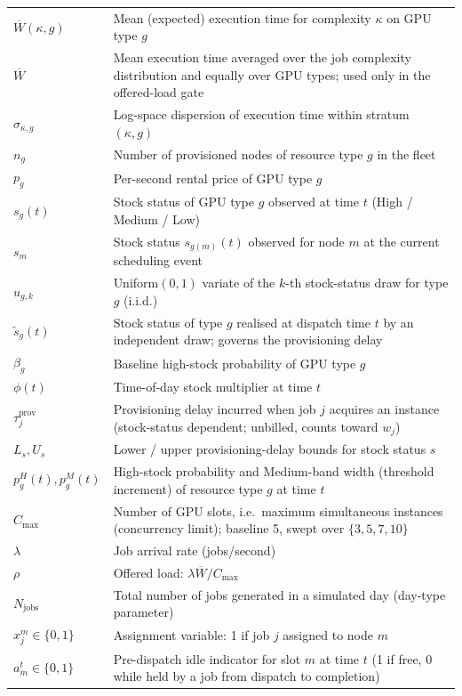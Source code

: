 \begin{longtable}{l>{\raggedright\arraybackslash}p{10cm}}
$\overline{W}(\kappa,g)$ & Mean (expected) execution time for complexity $\kappa$ on GPU type $g$ \\
$\overline{W}$ & Mean execution time averaged over the job complexity distribution and equally over GPU types; used only in the offered-load gate \\
$\sigma_{\kappa,g}$ & Log-space dispersion of execution time within stratum $(\kappa,g)$ \\
$n_g$ & Number of provisioned nodes of resource type $g$ in the fleet \\
$p_g$ & Per-second rental price of GPU type $g$ \\
$s_g(t)$ & Stock status of GPU type $g$ observed at time $t$ (High / Medium / Low) \\
$s_m$ & Stock status $s_{g(m)}(t)$ observed for node $m$ at the current scheduling event \\
$u_{g,k}$ & Uniform$(0,1)$ variate of the $k$-th stock-status draw for type $g$ (i.i.d.) \\
$\tilde s_{g}(t)$ & Stock status of type $g$ realised at dispatch time $t$ by an independent draw; governs the provisioning delay \\
$\beta_g$ & Baseline high-stock probability of GPU type $g$ \\
$\phi(t)$ & Time-of-day stock multiplier at time $t$ \\
$\tau^{\text{prov}}_j$ & Provisioning delay incurred when job $j$ acquires an instance (stock-status dependent; unbilled, counts toward $w_j$) \\
$L_s, U_s$ & Lower / upper provisioning-delay bounds for stock status $s$ \\
$p^{H}_g(t), p^{M}_g(t)$ & High-stock probability and Medium-band width (threshold increment) of resource type $g$ at time $t$ \\
$C_{\max}$ & Number of GPU slots, i.e.\ maximum simultaneous instances (concurrency limit); baseline 5, swept over $\{3, 5, 7, 10\}$ \\
$\lambda$ & Job arrival rate (jobs/second) \\
$\rho$ & Offered load: $\lambda \overline{W} / C_{\max}$ \\
$N_{\text{jobs}}$ & Total number of jobs generated in a simulated day (day-type parameter) \\
$x_j^m \in \{0,1\}$ & Assignment variable: 1 if job $j$ assigned to node $m$ \\
$a_m^t \in \{0,1\}$ & Pre-dispatch idle indicator for slot $m$ at time $t$ (1 if free, 0 while held by a job from dispatch to completion) \\

\end{longtable}
